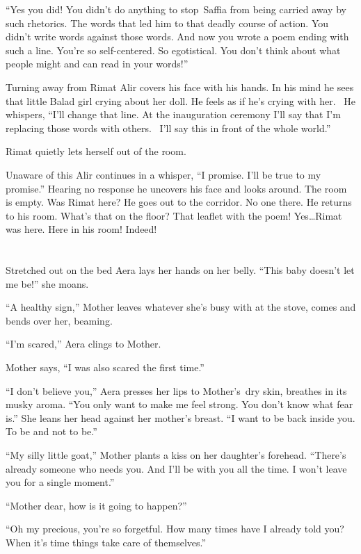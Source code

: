 \documentclass[twoside,11pt,openany]{book}
\begin{document}
``Yes you did! You didn't do anything to stop~Saffia from being carried away by such rhetorics. The words
that led him to that deadly course of action. You didn't write words against those words. And now you wrote a poem
ending with such a line. You're so self-centered. So
egotistical.{ }You don't think about what people might and can read
in your words!''

Turning away from Rimat Alir covers his face with his hands. In his mind he sees that little Balad girl crying about her
doll. He feels as if he's crying with her. ~He whispers, ``I'll change that line. At the inauguration
ceremony I'll say that I'm replacing those words with others.~ I'll say this in front of the whole
world.''

Rimat quietly lets herself out of the room.

Unaware of this Alir continues in a whisper, ``I promise.  I'll be true to my promise.''
Hearing no response he uncovers his face and looks around. The room is empty. Was Rimat here? He goes out to the
corridor. No one there. He returns to his room. What's that on the floor? That leaflet with the poem! Yes{\ldots}Rimat
was here. Here in his room! Indeed!


\chapter{}

Stretched out on the bed Aera lays her hands on her belly. ``This baby doesn't let me be!''
she moans.

``A healthy sign,'' Mother leaves whatever she's busy with at the stove, comes and bends over
her, beaming.

``I'm scared,'' Aera clings to Mother{.}

Mother says, ``I was also scared the{ }first time.''

``I don't believe you,'' Aera presses her lips{ }to Mother's~dry skin,
breathes in its musky aroma. ``You only want to make me feel strong. You don't know what fear
is.'' She leans her head against her mother's breast. ``I want to be back inside you. To be
and not to be.''

``My silly little goat,'' Mother plants a kiss on her daughter's forehead.
``There's already someone who needs you. And I'll be with you all the time. I won't leave you for a single
moment.''

``Mother dear, how is it going to happen?''

``Oh my precious, you're so forgetful. How many times have I already told you? When it's time things take
care of themselves.''
\end{document}
